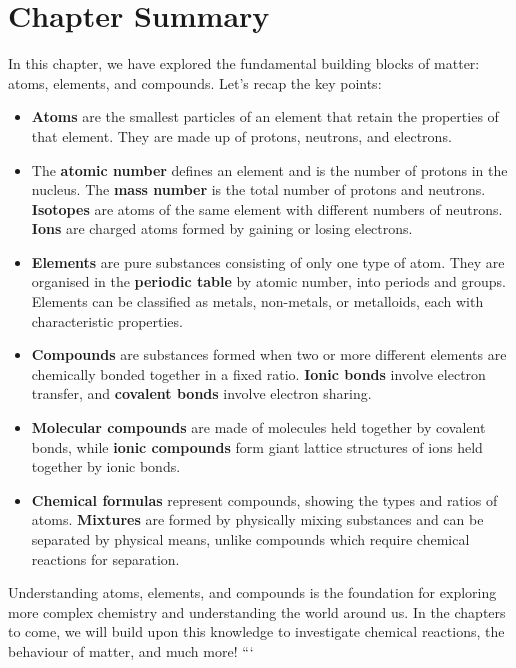 \section{Chapter Summary}

In this chapter, we have explored the fundamental building blocks of matter: atoms, elements, and compounds.  Let's recap the key points:

\begin{itemize}
    \item \textbf{Atoms} are the smallest particles of an element that retain the properties of that element. They are made up of protons, neutrons, and electrons.
    \item The \textbf{atomic number} defines an element and is the number of protons in the nucleus. The \textbf{mass number} is the total number of protons and neutrons. \textbf{Isotopes} are atoms of the same element with different numbers of neutrons. \textbf{Ions} are charged atoms formed by gaining or losing electrons.
    \item \textbf{Elements} are pure substances consisting of only one type of atom. They are organised in the \textbf{periodic table} by atomic number, into periods and groups. Elements can be classified as metals, non-metals, or metalloids, each with characteristic properties.
    \item \textbf{Compounds} are substances formed when two or more different elements are chemically bonded together in a fixed ratio.  \textbf{Ionic bonds} involve electron transfer, and \textbf{covalent bonds} involve electron sharing.
    \item \textbf{Molecular compounds} are made of molecules held together by covalent bonds, while \textbf{ionic compounds} form giant lattice structures of ions held together by ionic bonds.
    \item \textbf{Chemical formulas} represent compounds, showing the types and ratios of atoms. \textbf{Mixtures} are formed by physically mixing substances and can be separated by physical means, unlike compounds which require chemical reactions for separation.
\end{itemize}

Understanding atoms, elements, and compounds is the foundation for exploring more complex chemistry and understanding the world around us.  In the chapters to come, we will build upon this knowledge to investigate chemical reactions, the behaviour of matter, and much more!
```